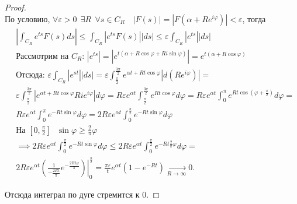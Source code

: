 \begin{proof} $ $ \\
%


По условию, $\forall \varepsilon > 0 \ \  \exists R \ \ \forall s \in C_R \quad \left| F(s) \right| = \left| F\left(\alpha + Re^{i\varphi}\right) \right|  < \varepsilon$, тогда
%
\begin{align*}
    & \left|\int_{C_R} e^{ts} F(s) ds\right| \le
      \int_{C_R} \left|e^{ts} F(s)\right| |ds| \le
      \varepsilon \int_{C_R} \left|e^{ts}\right| |ds|  \\
%
    & \text{Рассмотрим на $C_R$: } \left|e^{ts}\right| = \left|e^{t\left(\alpha+R\cos\varphi+Ri\sin\varphi\right)}\right| = e^{t\left(\alpha + R\cos\varphi\right)} \\
%
    & \text{Отсюда: } \varepsilon \int_{C_R} \left|e^{st}\right| |ds| = 
      \varepsilon \int_{\frac{\pi}{2}}^{\frac{3\pi}{2}} e^{\alpha t + R t \cos \varphi} \left|d\left(Re^{i\varphi}\right)\right| = \\
%
    & \varepsilon \int_{\frac{\pi}{2}}^{\frac{3\pi}{2}} \left|e^{\alpha t + R t \cos \varphi} R i e^{i\varphi} \right| d\varphi = 
      R\varepsilon e^{\alpha t} \int_{\frac{\pi}{2}}^{\frac{3\pi}{2}} e^{R t \cos\varphi} d\varphi = 
      R\varepsilon e^{\alpha t} \int_{0}^{\pi} e^{R t \cos \left(\varphi + \frac{\pi}{2}\right)} d\varphi = \\
%
    & R\varepsilon e^{\alpha t} \int_{0}^{\pi} e^{-R t \sin\varphi} d\varphi = 
      2R\varepsilon e^{\alpha t} \int_{0}^{\frac{\pi}{2}} e^{-R t \sin\varphi} d\varphi \\
%
    & \text{На $[0, \frac{\pi}{2}]$ } \sin\varphi \ge \frac{2}{\pi} \varphi \\
%
    & \implies 2R\varepsilon e^{\alpha t} \int_{0}^{\frac{\pi}{2}} e^{-R t \sin\varphi} d\varphi \le
      2R\varepsilon e^{\alpha t} \int_{0}^{\frac{\pi}{2}} e^{-R t \frac{2}{\pi}\varphi} d\varphi = \\
%
    & 2R\varepsilon e^{\alpha t} \left.\left( \frac{1}{-\frac{2Rt}{\pi}}e^{- \frac{2 R t \varphi}{\pi}} \right) \right|_0^{\frac{\pi}{2}} = 
         \frac{\pi\varepsilon}{t} e^{\alpha t} \left(1 - e^{- R t} \right) \xrightarrow[R \to \infty]{} 0
.\end{align*}

Отсюда интеграл по дуге стремится к $0$.
\end{proof}
